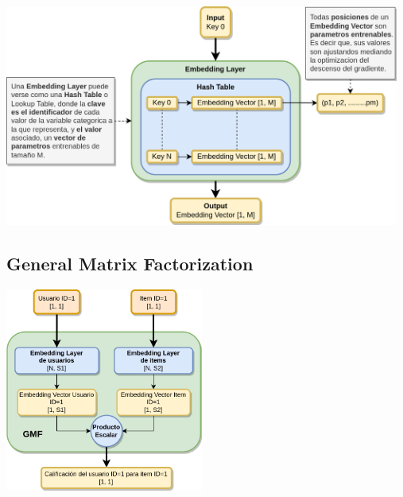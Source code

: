 \documentclass[11pt,a4paper,twoside]{thesis}
\begin{document}
\begin{center}
	\includegraphics[width=13cm]{./images/Embedding-Layer.png}
\end{center}

\subsection{General Matrix Factorization}

\begin{center}
	\includegraphics[width=6.5cm]{./images/GMF.png}
\end{center}
\end{document}
